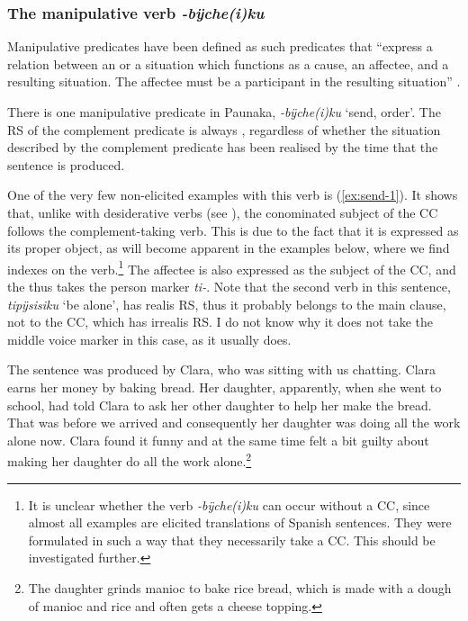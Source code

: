 \subsubsection{The manipulative verb \textit{-bÿche(i)ku}}\label{sec:CC_Manipulative}


Manipulative predicates have been defined as such predicates that “express a relation between an  or a situation which functions as a cause, an affectee, and a resulting situation. The affectee must be a participant in the resulting situation” \citep[136]{Noonan2007}.

There is one manipulative predicate in Paunaka, \textit{-bÿche(i)ku} ‘send, order’. %
The RS of the complement predicate is always , regardless of whether the situation described by the complement predicate has been realised by the time that the sentence is produced.

One of the very few non-elicited examples with this verb is (\ref{ex:send-1}). It shows that, unlike with desiderative verbs (see ), the conominated subject of the CC follows the complement-taking verb. This is due to the fact that it is expressed as its proper object, as will become apparent in the examples below, where we find indexes on the verb.\footnote{It is unclear whether the verb \textit{-bÿche(i)ku} can occur without a CC, since almost all examples are elicited translations of Spanish sentences. They were formulated in such a way that they necessarily take a CC. This should be investigated further.} The affectee is also expressed as the subject of the CC, and the  thus takes the person marker \textit{ti-}. Note that the second verb in this sentence, \textit{tipÿsisiku} ‘be alone’, has realis RS, thus it probably belongs to the main clause, not to the CC, which has irrealis RS. I do not know why it does not take the middle voice marker in this case, as it usually does.


The sentence was produced by Clara, who was sitting with us chatting. Clara earns her money by baking bread. Her daughter, apparently, when she went to school, had told Clara to ask her other daughter to help her make the bread. That was before we arrived and consequently her daughter was doing all the work alone now. Clara found it funny and at the same time felt a bit guilty about making her daughter do all the work alone.\footnote{The daughter grinds manioc to bake rice bread, which is made with a dough of manioc and rice and often gets a cheese topping.}


